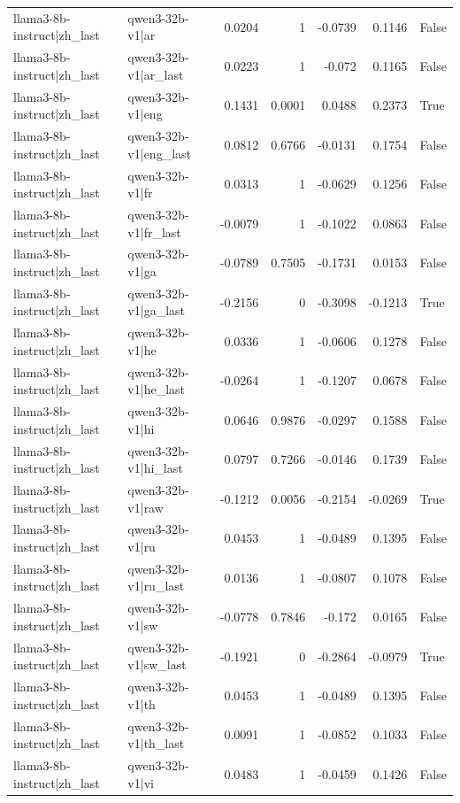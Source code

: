 \begin{table}
\begin{tabular}{l l r r r r l}
llama3-8b-instruct|zh_last & qwen3-32b-v1|ar & 0.0204 & 1 & -0.0739 & 0.1146 & False \\
llama3-8b-instruct|zh_last & qwen3-32b-v1|ar_last & 0.0223 & 1 & -0.072 & 0.1165 & False \\
llama3-8b-instruct|zh_last & qwen3-32b-v1|eng & 0.1431 & 0.0001 & 0.0488 & 0.2373 & True \\
llama3-8b-instruct|zh_last & qwen3-32b-v1|eng_last & 0.0812 & 0.6766 & -0.0131 & 0.1754 & False \\
llama3-8b-instruct|zh_last & qwen3-32b-v1|fr & 0.0313 & 1 & -0.0629 & 0.1256 & False \\
llama3-8b-instruct|zh_last & qwen3-32b-v1|fr_last & -0.0079 & 1 & -0.1022 & 0.0863 & False \\
llama3-8b-instruct|zh_last & qwen3-32b-v1|ga & -0.0789 & 0.7505 & -0.1731 & 0.0153 & False \\
llama3-8b-instruct|zh_last & qwen3-32b-v1|ga_last & -0.2156 & 0 & -0.3098 & -0.1213 & True \\
llama3-8b-instruct|zh_last & qwen3-32b-v1|he & 0.0336 & 1 & -0.0606 & 0.1278 & False \\
llama3-8b-instruct|zh_last & qwen3-32b-v1|he_last & -0.0264 & 1 & -0.1207 & 0.0678 & False \\
llama3-8b-instruct|zh_last & qwen3-32b-v1|hi & 0.0646 & 0.9876 & -0.0297 & 0.1588 & False \\
llama3-8b-instruct|zh_last & qwen3-32b-v1|hi_last & 0.0797 & 0.7266 & -0.0146 & 0.1739 & False \\
llama3-8b-instruct|zh_last & qwen3-32b-v1|raw & -0.1212 & 0.0056 & -0.2154 & -0.0269 & True \\
llama3-8b-instruct|zh_last & qwen3-32b-v1|ru & 0.0453 & 1 & -0.0489 & 0.1395 & False \\
llama3-8b-instruct|zh_last & qwen3-32b-v1|ru_last & 0.0136 & 1 & -0.0807 & 0.1078 & False \\
llama3-8b-instruct|zh_last & qwen3-32b-v1|sw & -0.0778 & 0.7846 & -0.172 & 0.0165 & False \\
llama3-8b-instruct|zh_last & qwen3-32b-v1|sw_last & -0.1921 & 0 & -0.2864 & -0.0979 & True \\
llama3-8b-instruct|zh_last & qwen3-32b-v1|th & 0.0453 & 1 & -0.0489 & 0.1395 & False \\
llama3-8b-instruct|zh_last & qwen3-32b-v1|th_last & 0.0091 & 1 & -0.0852 & 0.1033 & False \\
llama3-8b-instruct|zh_last & qwen3-32b-v1|vi & 0.0483 & 1 & -0.0459 & 0.1426 & False \\

\end{tabular}
\end{table}
